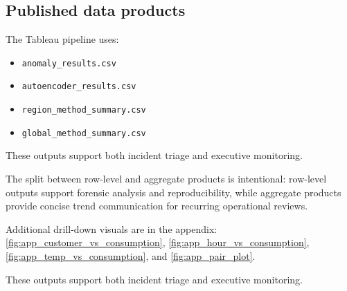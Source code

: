 \subsection{Published data products}
The Tableau pipeline uses:
\begin{itemize}
	\item \texttt{anomaly\_results.csv}
	\item \texttt{autoencoder\_results.csv}
	\item \texttt{region\_method\_summary.csv}
	\item \texttt{global\_method\_summary.csv}
\end{itemize}

These outputs support both incident triage and executive monitoring.

The split between row-level and aggregate products is intentional: row-level outputs support forensic analysis and reproducibility, while aggregate products provide concise trend communication for recurring operational reviews.

Additional drill-down visuals are in the appendix: \autoref{fig:app_customer_vs_consumption}, \autoref{fig:app_hour_vs_consumption}, \autoref{fig:app_temp_vs_consumption}, and \autoref{fig:app_pair_plot}.


These outputs support both incident triage and executive monitoring.
